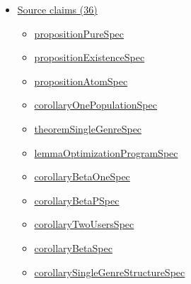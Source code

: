 \documentclass[10pt]{article}
\begin{document}
\begin{itemize}[leftmargin=1.2em]
\begin{itemize}[leftmargin=1.2em]
\item \hyperlink{paper-prerequisite-87699daab253dc47}{JGS23\allowbreak{}Supply\allowbreak{}Side\allowbreak{}Recommender\allowbreak{}Systems.\allowbreak{}reparameterized\allowbreak{}Equilibrium\allowbreak{}Model\allowbreak{}Spec}
\item \hyperlink{paper-prerequisite-618d52bbaf41b88b}{JGS23\allowbreak{}Supply\allowbreak{}Side\allowbreak{}Recommender\allowbreak{}Systems.\allowbreak{}single\allowbreak{}And\allowbreak{}Multi\allowbreak{}Genre\allowbreak{}Regimes\allowbreak{}Spec}
\item \hyperlink{paper-prerequisite-76fdf55539be1c53}{JGS23\allowbreak{}Supply\allowbreak{}Side\allowbreak{}Recommender\allowbreak{}Systems.\allowbreak{}two\allowbreak{}Population\allowbreak{}Model\allowbreak{}Spec}
\end{itemize}
\item \hyperlink{source-section-f10b5f68e4acf3dc}{Source claims (36)}
\begin{itemize}[leftmargin=1.2em]
\item \hyperlink{source-claim-fd4a3ee6aa2965fe}{proposition\allowbreak{}Pure\allowbreak{}Spec}
\item \hyperlink{source-claim-eae132c534318172}{proposition\allowbreak{}Existence\allowbreak{}Spec}
\item \hyperlink{source-claim-e16394dbd1f34803}{proposition\allowbreak{}Atom\allowbreak{}Spec}
\item \hyperlink{source-claim-f806add30f2f91cd}{corollary\allowbreak{}One\allowbreak{}Population\allowbreak{}Spec}
\item \hyperlink{source-claim-a8e4bb64ace372cc}{theorem\allowbreak{}Single\allowbreak{}Genre\allowbreak{}Spec}
\item \hyperlink{source-claim-80d9b15ea99d744d}{lemma\allowbreak{}Optimization\allowbreak{}Program\allowbreak{}Spec}
\item \hyperlink{source-claim-b9fe1dcef2a40678}{corollary\allowbreak{}Beta\allowbreak{}One\allowbreak{}Spec}
\item \hyperlink{source-claim-50393bc34777b8a7}{corollary\allowbreak{}Beta\allowbreak{}P\allowbreak{}Spec}
\item \hyperlink{source-claim-21cc7378ab024b6b}{corollary\allowbreak{}Two\allowbreak{}Users\allowbreak{}Spec}
\item \hyperlink{source-claim-4388a6e0e9c7deaf}{corollary\allowbreak{}Beta\allowbreak{}Spec}
\item \hyperlink{source-claim-f113ecd861da6d9e}{corollary\allowbreak{}Single\allowbreak{}Genre\allowbreak{}Structure\allowbreak{}Spec}

\end{itemize}
\end{itemize}
\end{document}

